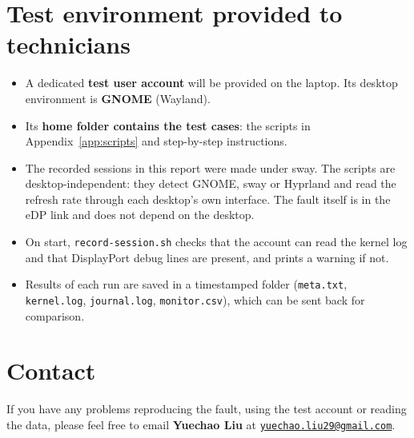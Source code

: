 \documentclass[11pt,a4paper]{article}
\newcommand{\reg}[1]{\texttt{#1}}
\begin{document}
\section{Test environment provided to technicians}
\label{sec:testenv}
\begin{itemize}
\item A dedicated \textbf{test user account} will be provided on the laptop. Its desktop environment is \textbf{GNOME} (Wayland).
\item Its \textbf{home folder contains the test cases}: the scripts in Appendix~\ref{app:scripts} and step-by-step instructions.
\item The recorded sessions in this report were made under sway. The scripts are desktop-independent: they detect GNOME, sway or
Hyprland and read the refresh rate through each desktop's own interface. The fault itself is in the eDP link and does not depend on the desktop.
\item On start, \reg{record-session.sh} checks that the account can read the kernel log and that DisplayPort debug lines are present,
and prints a warning if not.
\item Results of each run are saved in a timestamped folder (\reg{meta.txt}, \reg{kernel.log}, \reg{journal.log}, \reg{monitor.csv}), which can be sent back for comparison.
\end{itemize}

\section{Contact}
If you have any problems reproducing the fault, using the test account or reading the data, please feel free to email
\textbf{Yuechao Liu} at \href{mailto:yuechao.liu29@gmail.com}{\texttt{yuechao.liu29@gmail.com}}.

\end{document}
